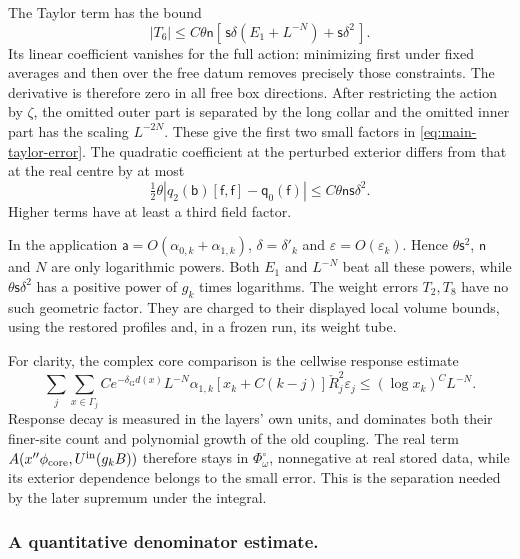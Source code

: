 \documentclass[11pt,letterpaper,reqno]{amsart}
\theoremstyle{definition}
\theoremstyle{remark}
\begin{document}
The Taylor term has the bound
\begin{equation}\label{eq:main-taylor-error}
 |T_6|\le C\theta\mathsf n
       [\,\mathsf s\delta(E_1+L^{-N})+\mathsf s\delta^2\,].
\end{equation}
Its linear coefficient vanishes for the full action:
minimizing first under fixed averages and then over the
free datum removes precisely those constraints. The
derivative is therefore zero in all free box directions.
After restricting the action by \(\zeta\), the omitted
outer part is separated by the long collar and the
omitted inner part has the scaling \(L^{-2N}\).
These give the first two small factors in
\eqref{eq:main-taylor-error}. The quadratic coefficient
at the perturbed exterior differs from that at the
real centre by at most
\[
 \tfrac12\theta
       |q_2(\mathsf b)[\mathsf f,\mathsf f]-\mathsf q_0(\mathsf f)|
       \le C\theta\mathsf n\mathsf s\delta^2.
\]
Higher terms have at least a third field factor.

In the application \(\mathsf a=O(\alpha_{0,k}+\alpha_{1,k})\),
\(\delta=\delta'_k\) and \(\varepsilon=O(\varepsilon_k)\).
Hence \(\theta\mathsf s^2\), \(\mathsf n\) and \(N\)
are only logarithmic powers. Both \(E_1\) and \(L^{-N}\)
beat all these powers, while
\(\theta\mathsf s\delta^2\) has a positive power of \(g_k\)
times logarithms. The weight errors \(T_2,T_8\) have no
such geometric factor. They are charged to their
displayed local volume bounds, using the restored
profiles and, in a frozen run, its weight tube.

For clarity, the complex core comparison is the cellwise
response estimate
\begin{equation}\label{eq:xrg-complex-core-error}
 \sum_j\sum_{x\in\Gamma_j}
 Ce^{-\delta_{\mathrm G}d(x)}L^{-N}\alpha_{1,k}
       [x_k+C(k-j)]\check R_j^2\varepsilon_j
                       \le(\log x_k)^C L^{-N}.
\end{equation}
Response decay is measured in the layers' own units,
and dominates both their finer-site count and polynomial
growth of the old coupling. The real term
\(A(x''\phi_{\mathrm{core}},U^{\rm in}(g_kB))\)
therefore stays in \(\Phi_\omega^\circ\), nonnegative
at real stored data, while its exterior dependence
belongs to the small error. This is the separation
needed by the later supremum under the integral.

\subsubsection*{A quantitative denominator estimate.}
\end{document}
